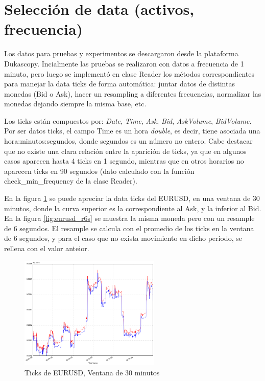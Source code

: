 \section{Selección de data (activos, frecuencia)}

Los datos para pruebas y experimentos se descargaron desde la plataforma
Dukascopy. Incialmente las pruebas se realizaron con datos a frecuencia de 1
minuto, pero luego se implementó en clase Reader los métodos correspondientes
para manejar la data ticks de forma automática: juntar datos de distintas monedas
(Bid o Ask), hacer un resampling a diferentes frecuencias, normalizar las
monedas dejando siempre la misma base, etc.

Los ticks están compuestos por: \emph{Date}, \emph{Time}, \emph{Ask},
\emph{Bid}, \emph{AskVolume}, \emph{BidVolume}. Por ser datos ticks, el campo
Time es un hora \emph{double}, es decir, tiene asociada una
hora:minutos:segundos, donde segundos es un número no entero. Cabe destacar que
no existe una clara relación entre la aparición de ticks, ya que en algunos
casos aparecen hasta 4 ticks en 1 segundo, mientras que en otros horarios no
aparecen ticks en 90 segundos (dato calculado con la función
check\_min\_frequency de la clase Reader). 

En la figura \ref{fig:eurusd_ticks} se puede apreciar la data ticks del EURUSD,
en una ventana de 30 minutos, donde la curva superior es la correspondiente al
Ask, y la inferior al Bid. En la figura \ref{fig:eurusd_r6s} se muestra la
misma moneda pero con un resample de 6 segundos. El resample se calcula con el
promedio de los ticks en la ventana de 6 segundos, y para el caso que no exista
movimiento en dicho periodo, se rellena con el valor anteior.

\begin{figure}[h!t]
    \begin{center}
        \includegraphics[width=0.6\textwidth]{images/eurusd}
        \caption{Ticks de EURUSD, Ventana de 30 minutos}
        \label{fig:eurusd_ticks}
    \end{center}
\end{figure}

